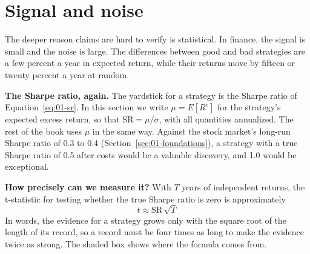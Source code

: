 \section{Signal and noise}
\label{sec:01-signal-noise}

The deeper reason claims are hard to verify is statistical. In finance, the signal is small and the noise is large. The differences between good and bad strategies are a few percent a year in expected return, while their returns move by fifteen or twenty percent a year at random.

\textbf{The Sharpe ratio, again.} The yardstick for a strategy is the Sharpe ratio of Equation~\eqref{eq:01-sr}. In this section we write $\mu = E[R^{e}]$ for the strategy's expected excess return, so that $\mathrm{SR} = \mu/\sigma$, with all quantities annualized. The rest of the book uses $\mu$ in the same way. Against the stock market's long-run Sharpe ratio of 0.3 to 0.4 (Section~\ref{sec:01-foundations}), a strategy with a true Sharpe ratio of 0.5 after costs would be a valuable discovery, and 1.0 would be exceptional.

\textbf{How precisely can we measure it?} With $T$ years of independent returns, the t-statistic for testing whether the true Sharpe ratio is zero is approximately
\begin{equation}
  t \approx \mathrm{SR}\,\sqrt{T}
  \label{eq:01-t}
\end{equation}
In words, the evidence for a strategy grows only with the square root of the length of its record, so a record must be four times as long to make the evidence twice as strong. The shaded box shows where the formula comes from.

